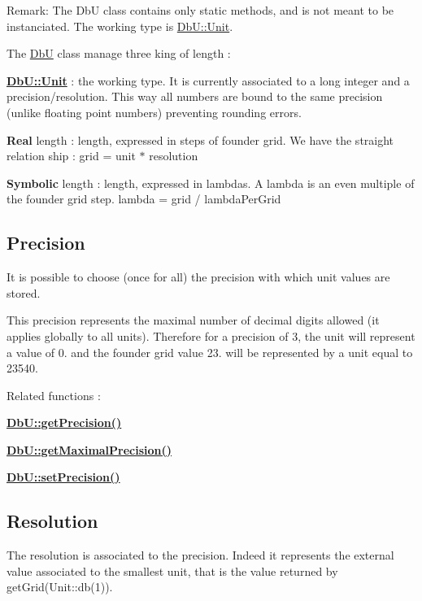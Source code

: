 \begin{DoxyParagraph}{Remark\+: The DbU class contains only static methods, and is not meant to}
be instanciated. The working type is \mbox{\hyperlink{group__DbUGroup_ga4fbfa3e8c89347af76c9628ea06c4146}{Db\+U\+::\+Unit}}.
\end{DoxyParagraph}
The \mbox{\hyperlink{classHurricane_1_1DbU}{DbU}} class manage three king of length \+: 
\begin{DoxyItemize}
\item {\bfseries \mbox{\hyperlink{group__DbUGroup_ga4fbfa3e8c89347af76c9628ea06c4146}{Db\+U\+::\+Unit}}} \+: the working type. It is currently associated to a long integer and a precision/resolution. This way all numbers are bound to the same precision (unlike floating point numbers) preventing rounding errors. 
\item {\bfseries Real} length \+: length, expressed in steps of founder grid. We have the straight relation ship \+: grid = unit $\ast$ resolution 
\item {\bfseries Symbolic} length \+: length, expressed in lambdas. A lambda is an even multiple of the founder grid step. lambda = grid / lambda\+Per\+Grid 
\end{DoxyItemize}\hypertarget{group__DbUGroup_secDbUPrecision}{}\subsection{Precision}\label{group__DbUGroup_secDbUPrecision}
It is possible to choose (once for all) the precision with which unit values are stored.

This precision represents the maximal number of decimal digits allowed (it applies globally to all units). Therefore for a precision of 3, the unit will represent a value of 0. and the founder grid value 23. will be represented by a unit equal to 23540.

Related functions \+: 
\begin{DoxyItemize}
\item {\bfseries \mbox{\hyperlink{group__DbUGroup_ga6169efbdd9b3d54a0bd8467c8f957fda}{Db\+U\+::get\+Precision()}}} 
\item {\bfseries \mbox{\hyperlink{group__DbUGroup_ga8756c9f0a32af5f601cd150e73b02c03}{Db\+U\+::get\+Maximal\+Precision()}}} 
\item {\bfseries \mbox{\hyperlink{group__DbUGroup_gace9a8644e7e80dcaed2a8a95deeb1622}{Db\+U\+::set\+Precision()}}} 
\end{DoxyItemize}\hypertarget{group__DbUGroup_secDbUResolution}{}\subsection{Resolution}\label{group__DbUGroup_secDbUResolution}
The resolution is associated to the precision. Indeed it represents the external value associated to the smallest unit, that is the value returned by get\+Grid(\+Unit\+::db(1)).

